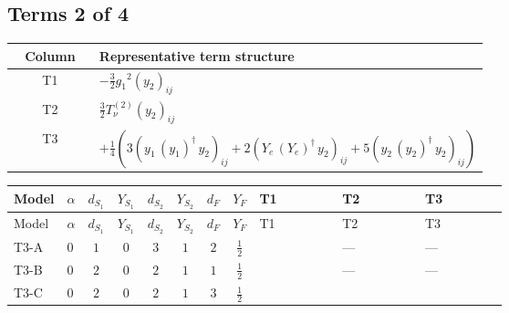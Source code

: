 \documentclass[8pt]{article}
\begin{document}
\begin{landscape}
\subsection*{Terms 2 of 4}
\begin{center}
\begin{tabular}{@{}c >{\raggedright\arraybackslash}p{0.82\linewidth}@{}}
\toprule
Column & Representative term structure \\
\midrule
T1 & \(\displaystyle -\frac{3}{2} {g_1}^2 \left({y_2}\right)_{ij}\) \\
\midrule
T2 & \(\displaystyle \frac{3}{2} T_{\nu}^{(2)} \left({y_2}\right)_{ij}\) \\
\midrule
T3 & \(\displaystyle +\frac{1}{4} (3 \left({y_1}\,\left({y_1}\right)^{\dagger}\,{y_2}\right)_{ij}+2 \left({Y_e}\,\left({Y_e}\right)^{\dagger}\,{y_2}\right)_{ij}+5 \left({y_2}\,\left({y_2}\right)^{\dagger}\,{y_2}\right)_{ij})\) \\
\midrule
\bottomrule
\end{tabular}
\end{center}
\smallskip
\tiny
\begin{longtable}{@{}llcccccc >{\raggedright\arraybackslash}p{0.21\linewidth} >{\raggedright\arraybackslash}p{0.21\linewidth} >{\raggedright\arraybackslash}p{0.21\linewidth}@{}}
\toprule
Model & $\alpha$ & $d_{S_1}$ & $Y_{S_1}$ & $d_{S_2}$ & $Y_{S_2}$ & $d_F$ & $Y_F$ & T1 & T2 & T3 \\
\midrule
\endfirsthead
\toprule
Model & $\alpha$ & $d_{S_1}$ & $Y_{S_1}$ & $d_{S_2}$ & $Y_{S_2}$ & $d_F$ & $Y_F$ & T1 & T2 & T3 \\
\midrule
\endhead
T3-A & $0$ & $1$ & $0$ & $3$ & $1$ & $2$ & $\frac{1}{2}$ & \scriptsize\adjustbox{max width=\linewidth}{$\begin{gathered} -\frac{3}{2} {g_1}^2 \left({y_2}\right)_{ij}\end{gathered}$} & --- & --- \\
\midrule
T3-B & $0$ & $2$ & $0$ & $2$ & $1$ & $1$ & $\frac{1}{2}$ & \scriptsize\adjustbox{max width=\linewidth}{$\begin{gathered} -\frac{3}{2} {g_1}^2 \left({y_2}\right)_{ij}\end{gathered}$} & --- & --- \\
\midrule
T3-C & $0$ & $2$ & $0$ & $2$ & $1$ & $3$ & $\frac{1}{2}$ & \scriptsize\adjustbox{max width=\linewidth}{$\begin{gathered} -\frac{3}{2} {g_1}^2 \left({y_2}\right)_{ij}\end{gathered}$} & \scriptsize\adjustbox{max width=\linewidth}{$\begin{gathered} \frac{3}{2} T_{\nu}^{(2)} \left({y_2}\right)_{ij}\end{gathered}$} & \scriptsize\adjustbox{max width=\linewidth}{$\begin{gathered} +\frac{1}{4} (3 \left({y_1}\,\left({y_1}\right)^{\dagger}\,{y_2}\right)_{ij}+2 \left({Y_e}\,\left({Y_e}\right)^{\dagger}\,{y_2}\right)_{ij}+5 \left({y_2}\,\left({y_2}\right)^{\dagger}\,{y_2}\right)_{ij})\end{gathered}$} \\

\end{longtable}
\end{landscape}
\end{document}
